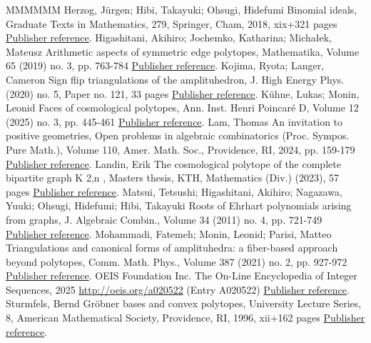 \documentclass[11pt]{article}
\theoremstyle{definition}
\numberwithin{equation}{section}
\begin{document}
\begin{thebibliography}{MMMMMM}
 Herzog, Jürgen; Hibi, Takayuki; Ohsugi, Hidefumi Binomial ideals, Graduate Texts in Mathematics, 279, Springer, Cham, 2018, xix+321 pages \href{https://alco.centre-mersenne.org/articles/10.5802/alco.430/#binomial}{Publisher reference}.
 Higashitani, Akihiro; Jochemko, Katharina; Michałek, Mateusz Arithmetic aspects of symmetric edge polytopes, Mathematika, Volume 65 (2019) no. 3, pp. 763-784 \href{https://alco.centre-mersenne.org/articles/10.5802/alco.430/#HJM}{Publisher reference}.
 Kojima, Ryota; Langer, Cameron Sign flip triangulations of the amplituhedron, J. High Energy Phys. (2020) no. 5, Paper no. 121, 33 pages \href{https://alco.centre-mersenne.org/articles/10.5802/alco.430/#kojima2020sign}{Publisher reference}.
 Kühne, Lukas; Monin, Leonid Faces of cosmological polytopes, Ann. Inst. Henri Poincaré D, Volume 12 (2025) no. 3, pp. 445-461 \href{https://alco.centre-mersenne.org/articles/10.5802/alco.430/#kuhne2022faces}{Publisher reference}.
 Lam, Thomas An invitation to positive geometries, Open problems in algebraic combinatorics (Proc. Sympos. Pure Math.), Volume 110, Amer. Math. Soc., Providence, RI, 2024, pp. 159-179 \href{https://alco.centre-mersenne.org/articles/10.5802/alco.430/#lam2022invitation}{Publisher reference}.
 Landin, Erik The cosmological polytope of the complete bipartite graph K 2,n , Masters thesis, KTH, Mathematics (Div.) (2023), 57 pages \href{https://alco.centre-mersenne.org/articles/10.5802/alco.430/#landin2023cosmological}{Publisher reference}.
 Matsui, Tetsushi; Higashitani, Akihiro; Nagazawa, Yuuki; Ohsugi, Hidefumi; Hibi, Takayuki Roots of Ehrhart polynomials arising from graphs, J. Algebraic Combin., Volume 34 (2011) no. 4, pp. 721-749 \href{https://alco.centre-mersenne.org/articles/10.5802/alco.430/#FirstSEP}{Publisher reference}.
 Mohammadi, Fatemeh; Monin, Leonid; Parisi, Matteo Triangulations and canonical forms of amplituhedra: a fiber-based approach beyond polytopes, Comm. Math. Phys., Volume 387 (2021) no. 2, pp. 927-972 \href{https://alco.centre-mersenne.org/articles/10.5802/alco.430/#mohammadi2021triangulations}{Publisher reference}.
 OEIS Foundation Inc. The On-Line Encyclopedia of Integer Sequences, 2025 \url{http://oeis.org/a020522} (Entry A020522) \href{https://alco.centre-mersenne.org/articles/10.5802/alco.430/#OEIS}{Publisher reference}.
 Sturmfels, Bernd Gröbner bases and convex polytopes, University Lecture Series, 8, American Mathematical Society, Providence, RI, 1996, xii+162 pages \href{https://alco.centre-mersenne.org/articles/10.5802/alco.430/#sturmfels1996grobner}{Publisher reference}.
\end{thebibliography}
\end{document}

